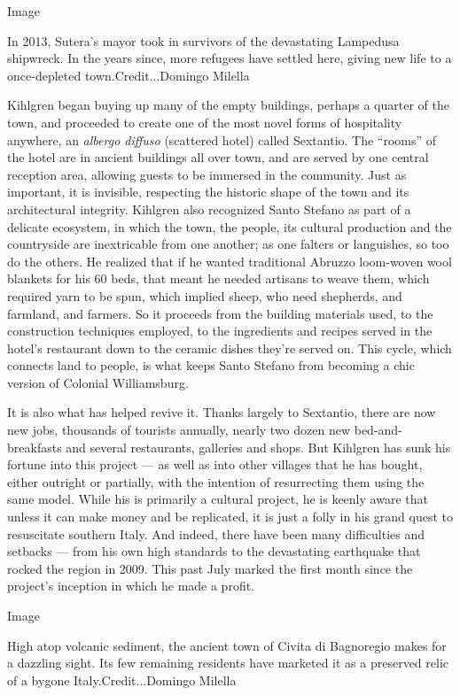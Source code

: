 Image

In 2013, Sutera's mayor took in survivors of the devastating Lampedusa
shipwreck. In the years since, more refugees have settled here, giving
new life to a once-depleted town.Credit...Domingo Milella

Kihlgren began buying up many of the empty buildings, perhaps a quarter
of the town, and proceeded to create one of the most novel forms of
hospitality anywhere, an \emph{albergo diffuso} (scattered hotel) called
Sextantio. The ``rooms'' of the hotel are in ancient buildings all over
town, and are served by one central reception area, allowing guests to
be immersed in the community. Just as important, it is invisible,
respecting the historic shape of the town and its architectural
integrity. Kihlgren also recognized Santo Stefano as part of a delicate
ecosystem, in which the town, the people, its cultural production and
the countryside are inextricable from one another; as one falters or
languishes, so too do the others. He realized that if he wanted
traditional Abruzzo loom-woven wool blankets for his 60 beds, that meant
he needed artisans to weave them, which required yarn to be spun, which
implied sheep, who need shepherds, and farmland, and farmers. So it
proceeds from the building materials used, to the construction
techniques employed, to the ingredients and recipes served in the
hotel's restaurant down to the ceramic dishes they're served on. This
cycle, which connects land to people, is what keeps Santo Stefano from
becoming a chic version of Colonial Williamsburg.

It is also what has helped revive it. Thanks largely to Sextantio, there
are now new jobs, thousands of tourists annually, nearly two dozen new
bed-and-breakfasts and several restaurants, galleries and shops. But
Kihlgren has sunk his fortune into this project --- as well as into
other villages that he has bought, either outright or partially, with
the intention of resurrecting them using the same model. While his is
primarily a cultural project, he is keenly aware that unless it can make
money and be replicated, it is just a folly in his grand quest to
resuscitate southern Italy. And indeed, there have been many
difficulties and setbacks --- from his own high standards to the
devastating earthquake that rocked the region in 2009. This past July
marked the first month since the project's inception in which he made a
profit.

Image

High atop volcanic sediment, the ancient town of Civita di Bagnoregio
makes for a dazzling sight. Its few remaining residents have marketed it
as a preserved relic of a bygone Italy.Credit...Domingo Milella

